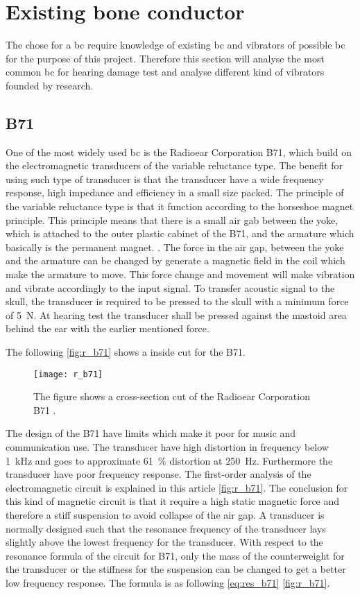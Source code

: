 \section{Existing bone conductor}
The chose for a \gls{bc} require knowledge of existing \gls{bc} and vibrators of possible \gls{bc} for the purpose of this project. Therefore this section will analyse the most common \gls{bc} for hearing damage test and analyse different kind of vibrators founded by research. 

\subsection{B71}
One of the most widely used \gls{bc} is the Radioear Corporation B71, which build on the electromagnetic transducers of the variable reluctance type. The benefit for using such type of transducer is that the transducer have a wide frequency response, high impedance and efficiency in a small size packed. The principle of the variable reluctance type is that it function according to the horseshoe magnet principle. This principle means that there is a small air gab between the yoke, which is attached to the outer plastic cabinet of the B71, and the armature which basically is the permanent magnet. \citep{the_balanced_2003}. The force in the air gap, between the yoke and the armature can be changed by generate a magnetic field in the coil which make the armature to move. This force change and movement will make vibration and vibrate accordingly to the input signal. To transfer acoustic signal to the skull, the transducer is required to be pressed to the skull with a minimum force of \SI{5}{\newton}. At hearing test the transducer shall be pressed against the mastoid area behind the ear with the earlier mentioned force. 


 The following \autoref{fig:r_b71} shows a inside cut for the B71.

 \begin{figure}[H]
	\centering
		\texttt{[image: r\_b71]}
		\caption{The figure shows a cross-section cut of the Radioear Corporation B71  \citep{the_balanced_2003}.}
		\label{fig:r_b71}
\end{figure}

The design of the B71 have limits which make it poor for music and communication use. The transducer have high distortion in frequency below \SI{1}{\kilo\hertz} and goes to approximate \SI{61}{\percent} distortion at \SI{250}{\hertz}. Furthermore the transducer have poor frequency response. The first-order analysis of the electromagnetic circuit is explained in this article \autoref{fig:r_b71}. The conclusion for this kind of magnetic circuit is that it require a high static magnetic force and therefore a stiff suspension to avoid collapse of the air gap. A transducer is normally designed such that the resonance frequency of the transducer lays slightly above the lowest frequency for the transducer. With respect to the resonance formula of the circuit for B71, only the mass of the counterweight for the transducer or the stiffness for the suspension can be changed to get a better low frequency response. The formula is as following \autoref{eq:res_b71} \autoref{fig:r_b71}.


